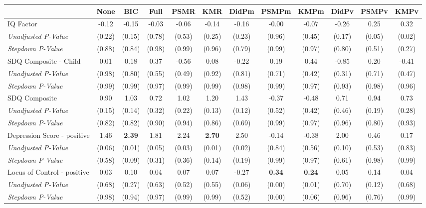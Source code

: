 \begin{tabular}{l c c c c c c c c c c c}
\toprule
 & None & BIC & Full & PSMR & KMR & DidPm & PSMPm & KMPm & DidPv & PSMPv & KMPv \\
\midrule
IQ Factor & -0.12 & -0.15 & -0.03 & -0.06 & -0.14 & -0.16 & -0.00 & -0.07 & -0.26 & 0.25 & 0.32 \\
\quad \textit{Unadjusted P-Value} & (0.22) & (0.15) & (0.78) & (0.53) & (0.25) & (0.23) & (0.96) & (0.45) & (0.17) & (0.05) & (0.02) \\
\quad \textit{Stepdown P-Value} & (0.88) & (0.84) & (0.98) & (0.99) & (0.96) & (0.79) & (0.99) & (0.97) & (0.80) & (0.51) & (0.27) \\
SDQ Composite - Child & 0.01 & 0.18 & 0.37 & -0.56 & 0.08 & -0.22 & 0.19 & 0.44 & -0.85 & 0.20 & -0.41 \\
\quad \textit{Unadjusted P-Value} & (0.98) & (0.80) & (0.55) & (0.49) & (0.92) & (0.81) & (0.71) & (0.42) & (0.31) & (0.71) & (0.47) \\
\quad \textit{Stepdown P-Value} & (0.99) & (0.99) & (0.97) & (0.99) & (0.99) & (0.98) & (0.99) & (0.97) & (0.93) & (0.98) & (0.96) \\
SDQ Composite & 0.90 & 1.03 & 0.72 & 1.02 & 1.20 & 1.43 & -0.37 & -0.48 & 0.71 & 0.94 & 0.73 \\
\quad \textit{Unadjusted P-Value} & (0.15) & (0.14) & (0.32) & (0.22) & (0.13) & (0.12) & (0.52) & (0.42) & (0.46) & (0.19) & (0.28) \\
\quad \textit{Stepdown P-Value} & (0.82) & (0.82) & (0.90) & (0.94) & (0.86) & (0.69) & (0.99) & (0.97) & (0.96) & (0.80) & (0.93) \\
Depression Score - positive & 1.46 & \textbf{ 2.39 } & 1.81 & 2.24 & \textbf{ 2.70 } & 2.50 & -0.14 & -0.38 & 2.00 & 0.46 & 0.17 \\
\quad \textit{Unadjusted P-Value} & (0.06) & (0.01) & (0.05) & (0.03) & (0.01) & (0.02) & (0.84) & (0.56) & (0.10) & (0.53) & (0.83) \\
\quad \textit{Stepdown P-Value} & (0.58) & (0.09) & (0.31) & (0.36) & (0.14) & (0.19) & (0.99) & (0.97) & (0.61) & (0.98) & (0.99) \\
Locus of Control - positive & 0.03 & 0.10 & 0.04 & 0.07 & 0.07 & -0.27 & \textbf{ 0.34 } & \textbf{ 0.24 } & 0.05 & 0.14 & 0.04 \\
\quad \textit{Unadjusted P-Value} & (0.68) & (0.27) & (0.63) & (0.52) & (0.55) & (0.06) & (0.00) & (0.01) & (0.70) & (0.12) & (0.68) \\
\quad \textit{Stepdown P-Value} & (0.98) & (0.94) & (0.97) & (0.99) & (0.99) & (0.52) & (0.00) & (0.06) & (0.96) & (0.76) & (0.99) \\

\end{tabular}
